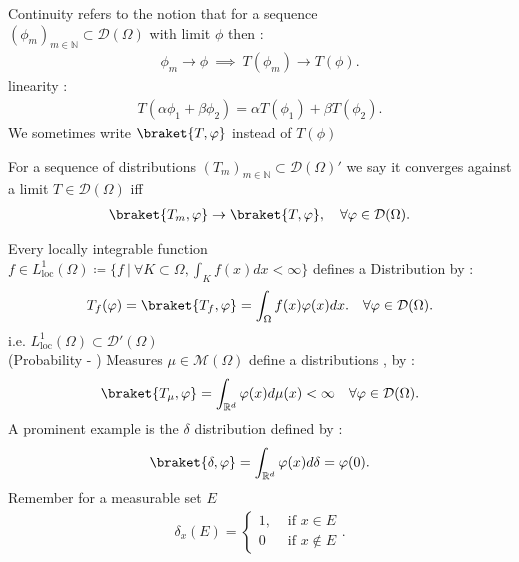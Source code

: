 \begin{remark}
  Continuity  refers to the notion that for a sequence \\  $(\phi_m)_{m \in  \mathbb{N}} \subset  \mathcal{D}(\Omega )$  with limit $\phi $ then : 
  \begin{align*}
    \phi_m \to \phi  \ \implies \ T(\phi_m) \to  T(\phi )
  .\end{align*}
  linearity : 
  \begin{align*}
    T(\alpha \phi_1 + \beta \phi_2) = \alpha T(\phi_1) + \beta T(\phi_2)
  .\end{align*}
  We sometimes write $\braket{T,\phi}$ instead of $T(\phi )$
\end{remark}
\begin{definition}[Convergence]
  For a sequence of distributions $(T_m)_{m \in  \mathbb{N}} \subset  \mathcal{D}(\Omega )'$  we say it converges against a limit $T \in \mathcal{D}(\Omega)$  iff 
  \begin{align*}
    \braket{T_m,\phi } \to  \braket{T,\phi } , \quad \forall \phi  \in  \mathcal{D}(\Omega )
  .\end{align*}
\end{definition}
\begin{example}
  Every locally integrable function $ f \in  L_{\text{loc}}^{1}(\Omega ) \coloneqq  \{f \ | \ \forall K \subset  \Omega , \int_K f(x) dx < \infty \}  $  defines a Distribution by    : 
  \begin{align*}
    T_f(\phi )  = \braket{T_f,\phi } = \int_\Omega f(x) \phi(x) dx . \quad \forall \phi \in \mathcal{D}(\Omega)
  .\end{align*}
  i.e. $L_{\text{loc}}^{1}(\Omega ) \subset  \mathcal{D}'(\Omega ) $ \\[2ex]
  (Probability - ) Measures $ \mu  \in  \mathcal{M}(\Omega )$ define  a distributions , by : 
  \begin{align*}
    \braket{T_\mu ,\phi } = \int_{\mathbb{R}^{d} } \phi(x) d\mu(x) < \infty \quad \forall \phi \in \mathcal{D}(\Omega)
  .\end{align*}
  A prominent example is the $\delta $ distribution defined by : 
  \begin{align*}
    \braket{\delta ,\phi } = \int_{\mathbb{R}^{d} } \phi(x) d \delta   = \phi(0)
  .\end{align*}
   Remember for a measurable set $E$ 
   \begin{align*}
    \delta_x(E) = \begin{cases}
      1, &\text{ if }x \in  E \\
      0  &\text{ if }x \not\in E
    \end{cases}
   .\end{align*}
\end{example}
